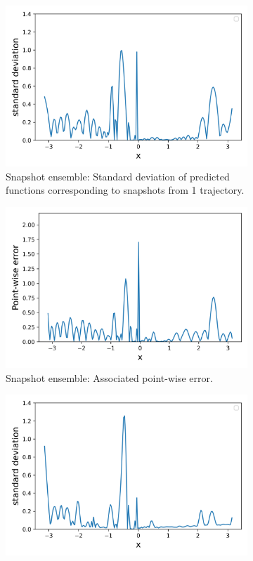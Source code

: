 \begin{figure}[H]
	\begin{subfigure}[b]{.45\textwidth}
		\centering
		\includegraphics[width=1\linewidth]{./figs/snap_rep_std.png}  
		\caption{Snapshot ensemble: Standard deviation of predicted functions corresponding to snapshots from 1 trajectory.}
	\end{subfigure}
	\begin{subfigure}[b]{.45\textwidth}
		\centering
		\includegraphics[width=1\linewidth]{./figs/snap_rep_err.png}  
		\caption{Snapshot ensemble: Associated point-wise error. \newline}
	\end{subfigure}
	\begin{subfigure}[b]{.45\textwidth}
		\centering
		\includegraphics[width=1\linewidth]{./figs/ens_std.png}  

\end{subfigure}
\end{figure}
